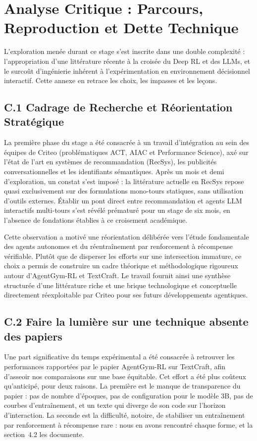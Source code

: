 \documentclass[11pt,a4paper]{article}
\begin{document}
\newpage
\section{Analyse Critique : Parcours, Reproduction et Dette Technique}
\label{sec:annexe_critique}

L'exploration menée durant ce stage s'est inscrite dans une double complexité : l'appropriation d'une littérature récente à la croisée du Deep RL et des LLMs, et le surcoût d'ingénierie inhérent à l'expérimentation en environnement décisionnel interactif. Cette annexe en retrace les choix, les impasses et les leçons.

\subsection*{C.1 Cadrage de Recherche et Réorientation Stratégique}
La première phase du stage a été consacrée à un travail d'intégration au sein des équipes de Criteo (problématiques ACT, AIAC et Performance Science), axé sur l'état de l'art en systèmes de recommandation (RecSys), les publicités conversationnelles et les identifiants sémantiques. Après un mois et demi d'exploration, un constat s'est imposé : la littérature actuelle en RecSys repose quasi exclusivement sur des formulations mono-tours statiques, sans utilisation d'outils externes. Établir un pont direct entre recommandation et agents LLM interactifs multi-tours s'est révélé prématuré pour un stage de six mois, en l'absence de fondations établies à ce croisement académique.

Cette observation a motivé une réorientation délibérée vers l'étude fondamentale des agents autonomes et du réentraînement par renforcement à récompense vérifiable. Plutôt que de disperser les efforts sur une intersection immature, ce choix a permis de construire un cadre théorique et méthodologique rigoureux autour d'AgentGym-RL et TextCraft. Le travail fournit ainsi une synthèse structurée d'une littérature riche et une brique technologique et conceptuelle directement réexploitable par Criteo pour ses futurs développements agentiques.

\subsection*{C.2 Faire la lumière sur une technique absente des papiers}
Une part significative du temps expérimental a été consacrée à retrouver les performances rapportées par le papier AgentGym-RL sur TextCraft, afin d'asseoir nos comparaisons sur une base équitable. Cet effort a été plus coûteux qu'anticipé, pour deux raisons. La première est le manque de transparence du papier : pas de nombre d'époques, pas de configuration pour le modèle 3B, pas de courbes d'entraînement, et un texte qui diverge de son code sur l'horizon d'interaction. La seconde est la difficulté, notoire, de stabiliser un entraînement par renforcement à récompense rare : nous en avons rencontré chaque forme, et la section~4.2 les documente.
\end{document}
